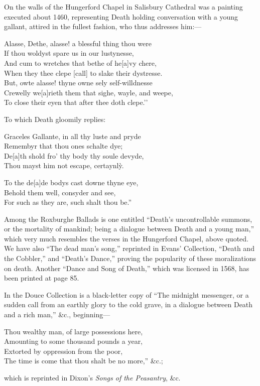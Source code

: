 On the walls of the Hungerford Chapel in Salisbury Cathedral was a painting
executed about 1460, representing Death holding conversation with a young
gallant, attired in the fullest fashion, who thus addresses him:—
\settowidth{\versewidth}{Alasse, Dethe, alasse! a blessful thing thou were}
\begin{scverse}
Alasse, Dethe, alasse! a blessful thing thou were\\
If thou woldyst spare us in our lustynesse,\\
And cum to wretches that bethe of he[a]vy chere,\\
When they thee clepe [call] to slake their dystresse.\\
But, owte alasse! thyne owne sely self-willdnesse\\
Crewelly we[a]rieth them that sighe, wayle, and weepe,\\
To close their eyen that after thee doth clepe.’’
\end{scverse}
To which Death gloomily replies:
\begin{scverse}
Graceles Gallante, in all thy luste and pryde\\
Remembyr that thou ones schalte dye;\\
De[a]th shold fro’ thy body thy soule devyde,\\
Thou mayst him not escape, certaynlỳ.
\end{scverse}
\pagebreak

\begin{scverse}
To the de[a]de bodys cast downe thyne eye,\\
Behold them well, consyder and see,\\
For such as they are, such shalt thou be.”
\end{scverse}

Among the Roxburghe Ballads is one entitled “Death’s uncontrollable summons,
or the mortality of mankind; being a dialogue between Death and a young
man,” which very much resembles the verses in the Hungerford Chapel, above
quoted. We have also “The dead man’s song,” reprinted in Evans’ Collection,
“Death and the Cobbler,” and “Death’s Dance,” proving the popularity of these
moralizations on death. Another “Dance and Song of Death,” which was
licensed in 1568, has been printed at page 85.

In the Douce Collection is a black-letter copy of “The midnight messenger, or
a sudden call from an earthly glory to the cold grave, in a dialogue between Death
and a rich man,” \&c., beginning—
\begin{scverse}Thou wealthy man, of large possessions here,\\
Amounting to some thousand pounds a year,\\
Extorted by oppression from the poor,\\
The time is come that thou shalt be no more,” \&c.;
\end{scverse}
which is reprinted in Dixon’s \textit{Songs of the Peasantry}, \&c.


